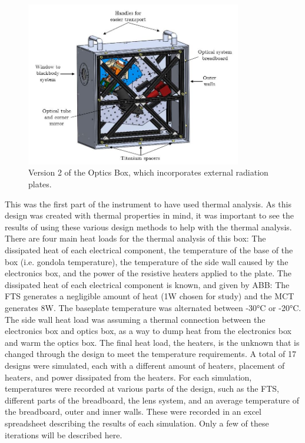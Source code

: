 \begin{figure}
    \centering
    \includegraphics[width=0.84\textwidth]{chap3_images/LIFE_V2_images/Optics_Box_V1_labelled.JPG}
    \caption{Version 2 of the Optics Box, which incorporates external radiation plates.}
    \label{fig:OB_V2}
\end{figure}

This was the first part of the instrument to have used thermal analysis. As this design was created with thermal properties in mind, it was important to see the results of using these various design methods to help with the thermal analysis. There are four main heat loads for the thermal analysis of this box: The dissipated heat of each electrical component, the temperature of the base of the box (i.e. gondola temperature), the temperature of the side wall caused by the electronics box, and the power of the resistive heaters applied to the plate. The dissipated heat of each electrical component is known, and given by ABB: The FTS generates a negligible amount of heat (1W chosen for study) and the MCT generates 8W. The baseplate temperature was alternated between -30°C or -20°C. The side wall heat load was assuming a thermal connection between the electronics box and optics box, as a way to dump heat from the electronics box and warm the optics box. The final heat load, the heaters, is the unknown that is changed through the design to meet the temperature requirements. A total of 17 designs were simulated, each with a different amount of heaters, placement of heaters, and power dissipated from the heaters. For each simulation, temperatures were recorded at various parts of the design, such as the FTS, different parts of the breadboard, the lens system, and an average temperature of the breadboard, outer and inner walls. These were recorded in an excel spreadsheet describing the results of each simulation. Only a few of these iterations will be described here.

